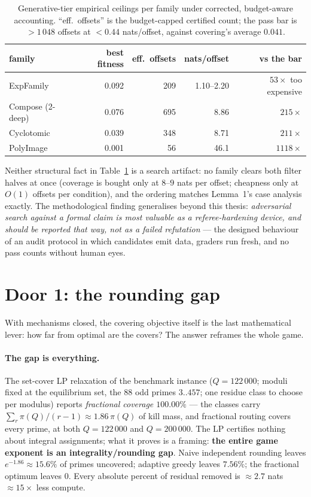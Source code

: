 \begin{table}[h]
\centering\small
\caption{Generative-tier empirical ceilings per family under corrected,
budget-aware accounting. ``eff.\ offsets'' is the budget-capped
certified count; the pass bar is $>1\,048$ offsets at $<0.44$
nats/offset, against covering's average $0.041$.}\label{tab:evolved}
\begin{tabular}{lrrrr}
\toprule
family & best fitness & eff.\ offsets & nats/offset & vs the bar\\
\midrule
\textsf{ExpFamily} & 0.092 & 209 & 1.10--2.20 & $53\times$ too expensive\\
\textsf{Compose} (2-deep) & 0.076 & 695 & 8.86 & $215\times$\\
\textsf{Cyclotomic} & 0.039 & 348 & 8.71 & $211\times$\\
\textsf{PolyImage} & 0.001 & 56 & 46.1 & $1118\times$\\
\bottomrule
\end{tabular}
\end{table}

Neither structural fact in Table~\ref{tab:evolved} is a search
artifact: no family clears both filter halves at once (coverage is
bought only at $8$--$9$ nats per offset; cheapness only at $O(1)$
offsets per condition), and the ordering matches Lemma~1's case
analysis exactly. The methodological finding generalises beyond this
thesis: \emph{adversarial search against a formal claim is most
valuable as a referee-hardening device, and should be reported that
way, not as a failed refutation} --- the designed behaviour of an audit
protocol in which candidates emit data, graders run fresh, and no pass
counts without human eyes.

\section{Door 1: the rounding gap}\label{sec:door1}

With mechanisms closed, the covering objective itself is the last
mathematical lever: how far from optimal are the covers? The answer
reframes the whole game.

\paragraph{The gap is everything.} The set-cover LP relaxation of the
benchmark instance ($Q=122\,000$; moduli fixed at the equilibrium set,
the $88$ odd primes $3..457$; one residue class to choose per modulus)
reports \emph{fractional coverage $100.00\%$} --- the classes carry
$\sum_r\pi(Q)/(r{-}1)\approx1.86\,\pi(Q)$ of kill mass, and fractional
routing covers every prime, at both $Q=122\,000$ and $Q=200\,000$. The
LP certifies nothing about integral assignments; what it proves is a
framing: \textbf{the entire game exponent is an integrality/rounding
gap}. Naive independent rounding leaves $e^{-1.86}\approx15.6\%$ of
primes uncovered; adaptive greedy leaves $7.56\%$; the fractional
optimum leaves $0$. Every absolute percent of residual removed is
$\approx2.7$ nats $\approx15\times$ less compute.

